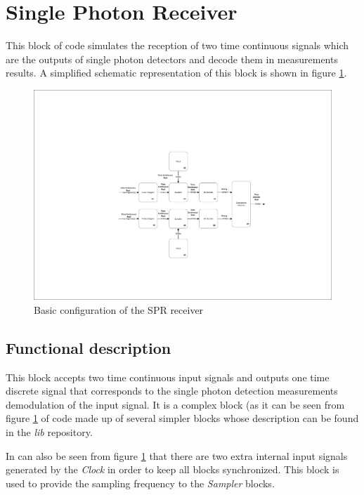 \clearpage

\section{Single Photon Receiver}

This block of code simulates the reception of two time continuous signals which are the outputs of single photon detectors and decode them in measurements results. A simplified schematic representation of this block is shown in figure \ref{SPR_receiver_block_diagram_simple}.

\begin{figure}[h]
	\centering
	\includegraphics[clip, trim=8cm 4cm 6cm 5cm, width=1.00\textwidth]{../lib/single_photon_receiver/figures/single_photon_receiver.pdf}
	\caption{Basic configuration of the SPR receiver}\label{SPR_receiver_block_diagram_simple}
\end{figure}

\subsection*{Functional description}

This block accepts two time continuous input signals and outputs one time discrete signal that corresponds to the single photon detection measurements demodulation of the input signal. It is a complex block (as it can be seen from figure \ref{SPR_receiver_block_diagram_simple} of code made up of several simpler blocks whose description can be found in the \textit{lib} repository.

In can also be seen from figure \ref{SPR_receiver_block_diagram_simple} that there are two extra internal input signals generated by the \textit{Clock} in order to keep all blocks synchronized. This block is used to provide the sampling frequency to the \textit{Sampler} blocks.


